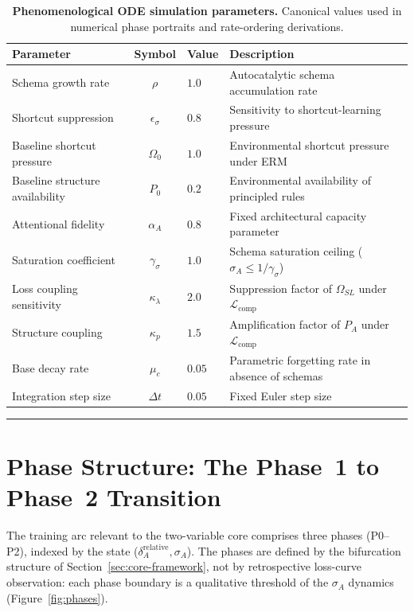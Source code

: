 \documentclass{article}
\theoremstyle{definition}
\begin{document}
\begin{table}[htbp]
\centering
\small
\caption{\textbf{Phenomenological ODE simulation parameters.} Canonical values used in numerical phase portraits and rate-ordering derivations.}\label{tab:ode-params}
\begin{tabular}{l c l l}
\toprule
\textbf{Parameter} & \textbf{Symbol} & \textbf{Value} & \textbf{Description} \\
\midrule
Schema growth rate & $\rho$ & $1.0$ & Autocatalytic schema accumulation rate \\
Shortcut suppression & $\epsilon_\sigma$ & $0.8$ & Sensitivity to shortcut-learning pressure \\
Baseline shortcut pressure & $\Omega_0$ & $1.0$ & Environmental shortcut pressure under ERM \\
Baseline structure availability & $P_0$ & $0.2$ & Environmental availability of principled rules \\
Attentional fidelity & $\alpha_A$ & $0.8$ & Fixed architectural capacity parameter \\
Saturation coefficient & $\gamma_\sigma$ & $1.0$ & Schema saturation ceiling ($\sigma_A \le 1/\gamma_\sigma$) \\
Loss coupling sensitivity & $\kappa_\lambda$ & $2.0$ & Suppression factor of $\Omega_{SL}$ under $\mathcal{L}_{\text{comp}}$ \\
Structure coupling & $\kappa_p$ & $1.5$ & Amplification factor of $P_A$ under $\mathcal{L}_{\text{comp}}$ \\
Base decay rate & $\mu_c$ & $0.05$ & Parametric forgetting rate in absence of schemas \\
Integration step size & $\Delta t$ & $0.05$ & Fixed Euler step size \\
\bottomrule
\end{tabular}
\end{table}

\noindent\rule{\linewidth}{0.4pt}

\section{Phase Structure: The Phase~1 to Phase~2 Transition}\label{sec:phase-structure}

The training arc relevant to the two-variable core comprises three phases
(P0--P2), indexed by the state
($\delta_A^{\text{relative}}, \sigma_A$). The phases are defined by the bifurcation structure of
Section~\ref{sec:core-framework}, not by retrospective loss-curve
observation: each phase boundary is a qualitative threshold of the
$\sigma_A$ dynamics (Figure~\ref{fig:phases}).
\end{document}
